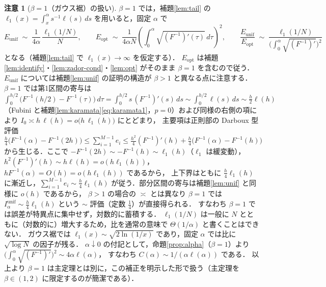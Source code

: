 \documentclass[a4paper,10pt]{jsarticle}
\theoremstyle{definition}
\newtheorem{remark}{注意}[section]
\newcommand{\Finv}{F^{-1}}
\newcommand{\Eunif}{E_{\mathrm{unif}}}
\newcommand{\Eopt}{E_{\mathrm{opt}}}
\newcommand{\Iunif}{I_\alpha^{\mathrm{unif}}}
\begin{document}
\begin{remark}[$\beta=1$（ガウス裾）の扱い]
\label{rem:beta1}
$\beta=1$ では，補題\ref{lem:tail} の $\ell_1(x)=\int_x^\alpha s^{-1}\ell(s)\,ds$ を用いると，固定 $\alpha$ で
\begin{equation*}
  \Eunif\;\sim\;\frac1{4\alpha}\,\frac{\ell_1(1/N)}{N},\qquad
  \Eopt\;\sim\;\frac1{4\alpha N}\left(\int_0^\alpha\sqrt{(\Finv)'(\tau)}\,d\tau\right)^{2},\qquad
  \frac{\Eunif}{\Eopt}\;\sim\;\frac{\ell_1(1/N)}{\bigl(\int_0^\alpha\sqrt{(\Finv)'}\bigr)^{2}}
\end{equation*}
となる（補題\ref{lem:tail} で $\ell_1(x)\to\infty$ を仮定する）．
$\Eopt$ は補題\ref{lem:identify}・\ref{lem:zador-cond}・\ref{lem:opt} がそのまま $\beta=1$ を含むので従う．
$\Eunif$ については補題\ref{lem:unif} の証明の構造が $\beta>1$ と異なる点に注意する．$\beta=1$ では第1区間の寄与は
$\int_0^{h/2}\bigl(\Finv(h/2)-\Finv(\tau)\bigr)\,d\tau=\int_0^{h/2}s\,(\Finv)'(s)\,ds\sim\int_0^{h/2}\ell(s)\,ds\sim\tfrac h2\ell(h)$
（Fubini と補題\ref{lem:karamata}\eqref{eq:karamata1}，$p=0$）および同様の右側の項により $I_0\asymp h\,\ell(h)=o\bigl(h\,\ell_1(h)\bigr)$ にとどまり，
主要項は正則部の Darboux 型評価
$\frac h4\bigl(\Finv(\alpha)-\Finv(2h)\bigr)\le\sum_{i=1}^{M-1}e_i\le\frac{h^2}4(\Finv)'(h)+\frac h4\bigl(\Finv(\alpha)-\Finv(h)\bigr)$
から生じる．ここで $-\Finv(2h)\sim-\Finv(h)\sim\ell_1(h)$（$\ell_1$ は緩変動），$h^2(\Finv)'(h)\sim h\ell(h)=o(h\ell_1(h))$，$h\Finv(\alpha)=O(h)=o(h\ell_1(h))$ であるから，
上下界はともに $\tfrac h4\ell_1(h)$ に漸近し，$\sum_{i=1}^{M-1}e_i\sim\tfrac h4\ell_1(h)$ が従う．部分区間の寄与は補題\ref{lem:unif} と同様に $o(h)$ であるから，
$\beta>1$ の場合の $\asymp$ とは異なり $\beta=1$ では $\Iunif\sim\tfrac h4\ell_1(h)$ という $\sim$ 評価（定数 $\tfrac14$）が直接得られる．
すなわち $\beta=1$ では誤差が特異点に集中せず，対数的に蓄積する．
$\ell_1(1/N)$ は一般に $N$ とともに（対数的に）増大するため，比を通常の意味で $\Theta(1/\alpha)$ と書くことはできない．
ガウス裾では $\ell_1(x)\sim\sqrt{2\ln(1/x)}$ であり，固定 $\alpha$ では比に $\sqrt{\log N}$ の因子が残る．
$\alpha\downarrow0$ の付記として，命題\ref{prop:alpha}（$\beta=1$）より $\bigl(\int_0^\alpha\sqrt{(\Finv)'}\bigr)^2\sim4\alpha\ell(\alpha)$，
すなわち $C(\alpha)\sim1/(\alpha\ell(\alpha))$ である．
以上より $\beta=1$ は主定理とは別に，この補正を明示した形で扱う（主定理を $\beta\in(1,2)$ に限定するのが簡潔である）．
\end{remark}
\end{document}

